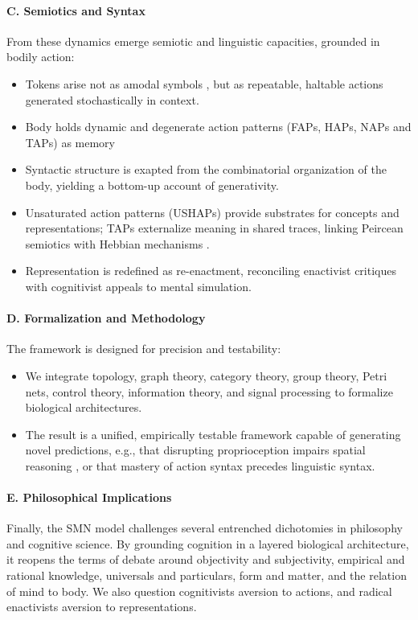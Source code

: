 \paragraph{C. Semiotics and Syntax}
From these dynamics emerge semiotic and linguistic capacities, grounded in bodily action:
\begin{itemize}
    \item Tokens arise not as amodal symbols \citep{fodor1975language, pylyshyn1984computation}, but as repeatable, haltable actions generated stochastically in context.
    \item Body holds dynamic and degenerate action patterns (FAPs, HAPs, NAPs and TAPs) as memory
    \item Syntactic structure is exapted from the combinatorial organization of the body, yielding a bottom-up account of generativity.
    \item Unsaturated action patterns (USHAPs) provide substrates for concepts and representations; TAPs externalize meaning in shared traces, linking Peircean semiotics with Hebbian mechanisms \citep{hebb1949organisation}.
    \item Representation is redefined as re-enactment, reconciling enactivist critiques with cognitivist appeals to mental simulation.
\end{itemize}

\paragraph{D. Formalization and Methodology}
The framework is designed for precision and testability:
\begin{itemize}
    \item We integrate topology, graph theory, category theory, group theory, Petri nets, control theory, information theory, and signal processing to formalize biological architectures.
    \item The result is a unified, empirically testable framework capable of generating novel predictions, e.g., that disrupting proprioception impairs spatial reasoning \citep{proprioception_spatial, proprioception_reasoning}, or that mastery of action syntax precedes linguistic syntax.
\end{itemize}

\paragraph{E. Philosophical Implications}
Finally, the SMN model challenges several entrenched dichotomies in philosophy and cognitive science. By grounding cognition in a layered biological architecture, it reopens the terms of debate around objectivity and subjectivity, empirical and rational knowledge, universals and particulars, form and matter, and the relation of mind to body. We also question cognitivists aversion to actions, and radical enactivists aversion to representations. 

